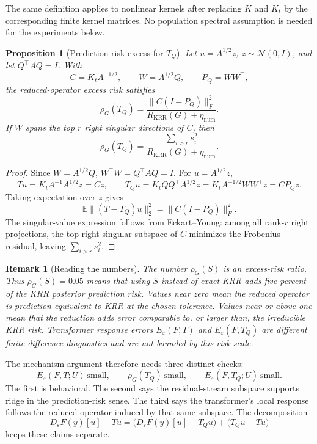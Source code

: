 \documentclass[11pt]{article}
\newtheorem{proposition}{Proposition}
\newtheorem{remark}{Remark}
\begin{document}
The same definition applies to nonlinear kernels after replacing \(K\) and \(K_t\) by the
corresponding finite kernel matrices. No population spectral assumption is needed for the
experiments below.

\begin{proposition}[Prediction-risk excess for \(T_Q\)]
Let \(u=A^{1/2}z\), \(z\sim\mathcal{N}(0,I)\), and let \(Q^\top A Q=I\). With
\[
C=K_tA^{-1/2},\qquad W=A^{1/2}Q,\qquad P_Q=WW^\top,
\]
the reduced-operator excess risk satisfies
\[
\rho_G(T_Q)
=
\frac{\|C(I-P_Q)\|_F^2}{R_{\mathrm{KRR}}(G)+\eta_{\mathrm{num}}}.
\]
If \(W\) spans the top \(r\) right singular directions of \(C\), then
\[
\rho_G(T_Q)
=
\frac{\sum_{i>r}s_i^2}{R_{\mathrm{KRR}}(G)+\eta_{\mathrm{num}}}.
\]
\end{proposition}

\begin{proof}
Since \(W=A^{1/2}Q\), \(W^\top W=Q^\top A Q=I\). For \(u=A^{1/2}z\),
\[
Tu=K_tA^{-1}A^{1/2}z=Cz,
\qquad
T_Qu=K_tQQ^\top A^{1/2}z=K_tA^{-1/2}WW^\top z=CP_Qz.
\]
Taking expectation over \(z\) gives
\[
\mathbb{E}\|(T-T_Q)u\|_2^2=\|C(I-P_Q)\|_F^2.
\]
The singular-value expression follows from Eckart--Young: among all rank-\(r\) right
projections, the top right singular subspace of \(C\) minimizes the Frobenius residual, leaving
\(\sum_{i>r}s_i^2\).
\end{proof}

\begin{remark}[Reading the numbers]
The number \(\rho_G(S)\) is an excess-risk ratio. Thus \(\rho_G(S)=0.05\) means that using \(S\)
instead of exact KRR adds five percent of the KRR posterior prediction risk. Values near zero mean
the reduced operator is prediction-equivalent to KRR at the chosen tolerance. Values near or above
one mean that the reduction adds error comparable to, or larger than, the irreducible KRR risk.
Transformer response errors \(E_\varepsilon(F,T)\) and \(E_\varepsilon(F,T_Q)\) are different
finite-difference diagnostics and are not bounded by this risk scale.
\end{remark}

The mechanism argument therefore needs three distinct checks:
\[
E_\varepsilon(F,T;U)\ \text{small},
\qquad
\rho_G(T_Q)\ \text{small},
\qquad
E_\varepsilon(F,T_Q;U)\ \text{small}.
\]
The first is behavioral. The second says the residual-stream subspace supports ridge in the
prediction-risk sense. The third says the transformer's local response follows the reduced
operator induced by that same subspace. The decomposition
\[
D_\varepsilon F(y)[u]-Tu
=
\bigl(D_\varepsilon F(y)[u]-T_Qu\bigr)
+
\bigl(T_Qu-Tu\bigr)
\]
keeps these claims separate.
\end{document}
